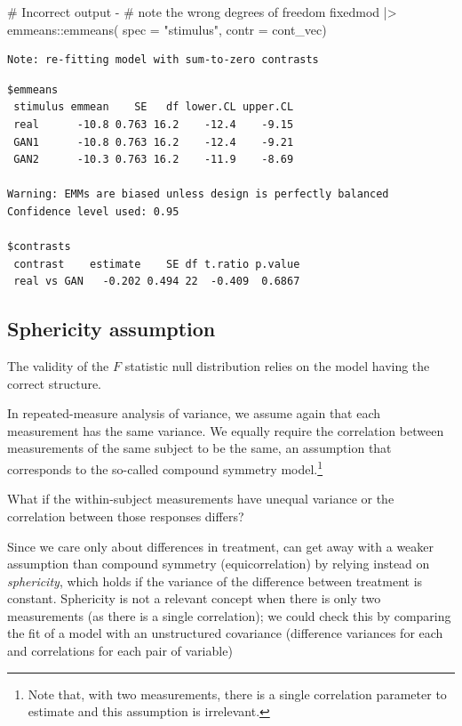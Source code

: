 \documentclass[
  11pt,
  letterpaper,
]{scrbook}
\newenvironment{Shaded}{\begin{snugshade}}{\end{snugshade}}
\newcommand{\AttributeTok}[1]{\textcolor[rgb]{0.40,0.45,0.13}{#1}}
\newcommand{\CommentTok}[1]{\textcolor[rgb]{0.37,0.37,0.37}{#1}}
\newcommand{\FunctionTok}[1]{\textcolor[rgb]{0.28,0.35,0.67}{#1}}
\newcommand{\NormalTok}[1]{\textcolor[rgb]{0.00,0.23,0.31}{#1}}
\newcommand{\SpecialCharTok}[1]{\textcolor[rgb]{0.37,0.37,0.37}{#1}}
\newcommand{\StringTok}[1]{\textcolor[rgb]{0.13,0.47,0.30}{#1}}
\theoremstyle{definition}
\theoremstyle{definition}
\theoremstyle{remark}
\begin{document}
\begin{Shaded}
\begin{Highlighting}[]
\CommentTok{\# Incorrect output {-} }
\CommentTok{\# note the wrong degrees of freedom}
\NormalTok{fixedmod }\SpecialCharTok{|\textgreater{}} 
\NormalTok{  emmeans}\SpecialCharTok{::}\FunctionTok{emmeans}\NormalTok{(}
    \AttributeTok{spec =} \StringTok{"stimulus"}\NormalTok{, }
    \AttributeTok{contr =}\NormalTok{ cont\_vec)}
\end{Highlighting}
\end{Shaded}

\begin{verbatim}
Note: re-fitting model with sum-to-zero contrasts
\end{verbatim}

\begin{verbatim}
$emmeans
 stimulus emmean    SE   df lower.CL upper.CL
 real      -10.8 0.763 16.2    -12.4    -9.15
 GAN1      -10.8 0.763 16.2    -12.4    -9.21
 GAN2      -10.3 0.763 16.2    -11.9    -8.69

Warning: EMMs are biased unless design is perfectly balanced 
Confidence level used: 0.95 

$contrasts
 contrast    estimate    SE df t.ratio p.value
 real vs GAN   -0.202 0.494 22  -0.409  0.6867
\end{verbatim}

\subsection{Sphericity assumption}\label{sphericity-assumption}

The validity of the \(F\) statistic null distribution relies on the
model having the correct structure.

In repeated-measure analysis of variance, we assume again that each
measurement has the same variance. We equally require the correlation
between measurements of the same subject to be the same, an assumption
that corresponds to the so-called compound symmetry model.\footnote{Note
  that, with two measurements, there is a single correlation parameter
  to estimate and this assumption is irrelevant.}

What if the within-subject measurements have unequal variance or the
correlation between those responses differs?

Since we care only about differences in treatment, can get away with a
weaker assumption than compound symmetry (equicorrelation) by relying
instead on \emph{sphericity}, which holds if the variance of the
difference between treatment is constant. Sphericity is not a relevant
concept when there is only two measurements (as there is a single
correlation); we could check this by comparing the fit of a model with
an unstructured covariance (difference variances for each and
correlations for each pair of variable)
\end{document}
